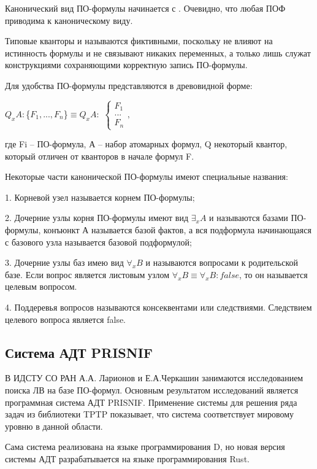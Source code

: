Канонический вид ПО-формулы начинается с \forall\emptyset. Очевидно, что любая ПОФ приводима к каноническому виду. 

Типовые кванторы \forall\emptyset и \exists\emptyset называются фиктивными, поскольку не влияют на истинность формулы и не связывают никаких переменных, а только лишь служат конструкциями сохраняющими корректную запись ПО-формулы.

Для удобства ПО-формулы представляются в древовидной форме:

$Q_x A: $\{$F_1,...,F_n$\}$ \equiv Q_x A:  $
\begin{math}
    \begin{cases}
        F_1\\
        ...\\
        F_n
    \end{cases},
\end{math}

 где Fi – ПО-формула, А – набор атомарных формул, Q некоторый квантор, который отличен от кванторов в начале формул F.

 Некоторые части канонической ПО-формулы имеют специальные названия:

 1. Корневой узел \forall\emptyset называется корнем ПО-формулы;

 2. Дочерние узлы корня ПО-формулы имеют вид $\exists_x A$ и называются базами ПО-формулы, конъюнкт А называется базой фактов, а вся подформула начинающаяся с базового узла называется базовой подформулой;

 3. Дочерние узлы баз имею вид $\forall_x B$ и называются вопросами к родительской базе. Если вопрос является листовым узлом $\forall_x B\equiv\forall_x B:false$, то он называется целевым вопросом.

 4. Поддеревья вопросов называются консеквентами или следствиями. Следствием целевого вопроса является false.

\subsection{Система АДТ PRISNIF}

В ИДСТУ СО РАН А.А. Ларионов и Е.А.Черкашин занимаются исследованием поиска  ЛВ на базе ПО-формул. Основным результатом исследований является программная система АДТ PRISNIF. Применение системы для решения ряда задач из библиотеки TPTP показывает, что система соответствует мировому уровню в данной области.

Сама система реализована на языке программирования D, но новая версия системы АДТ разрабатывается на языке программирования Rust.

